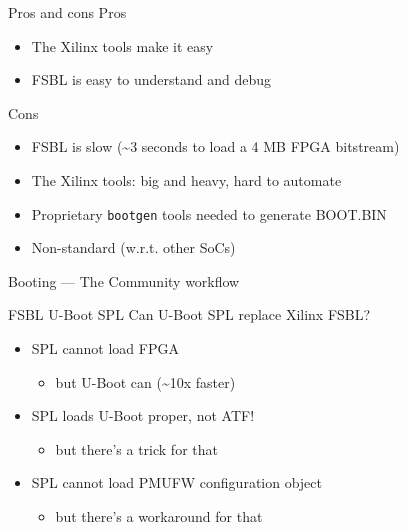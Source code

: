 \documentclass[xetex,table]{beamer}
\begin{document}
\begin{frame}{Pros and cons}
    Pros
    \begin{itemize}
    \item The Xilinx tools make it easy
    \item FSBL is easy to understand and debug
    \end{itemize}

    Cons
    \begin{itemize}
    \item FSBL is slow (\textasciitilde{}3 seconds to load a 4 MB FPGA
        bitstream)
    \item The Xilinx tools: big and heavy, hard to automate
    \item Proprietary {\tt bootgen} tools needed to generate BOOT.BIN
    \item Non-standard (w.r.t. other SoCs)
    \end{itemize}
\end{frame}

\begin{frame}[standout]
   Booting --- The Community workflow
\end{frame}

\begin{frame}{FSBL \textrightarrow{} U-Boot SPL}
  Can U-Boot SPL replace Xilinx FSBL?
  \begin{itemize}
  \pause\item SPL cannot load FPGA
    \begin{itemize}
    \item but U-Boot can (\textasciitilde{}10x faster)
    \end{itemize}
  \pause\item SPL loads U-Boot proper, not ATF!
    \begin{itemize}
    \item but there's a trick for that
    \end{itemize}
  \pause\item SPL cannot load PMUFW configuration object
    \begin{itemize}
    \item but there's a workaround for that
    \end{itemize}
  \end{itemize}
\end{frame}
\end{document}
